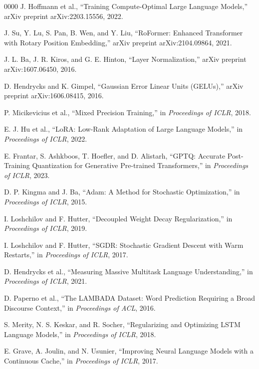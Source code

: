 \documentclass[conference]{IEEEtran}
\begin{document}
\begin{thebibliography}{00}{00}
J. Hoffmann et al., ``Training Compute-Optimal Large Language Models,'' arXiv preprint arXiv:2203.15556, 2022.

J. Su, Y. Lu, S. Pan, B. Wen, and Y. Liu, ``RoFormer: Enhanced Transformer with Rotary Position Embedding,'' arXiv preprint arXiv:2104.09864, 2021.

J. L. Ba, J. R. Kiros, and G. E. Hinton, ``Layer Normalization,'' arXiv preprint arXiv:1607.06450, 2016.

D. Hendrycks and K. Gimpel, ``Gaussian Error Linear Units (GELUs),'' arXiv preprint arXiv:1606.08415, 2016.

P. Micikevicius et al., ``Mixed Precision Training,'' in \textit{Proceedings of ICLR}, 2018.

E. J. Hu et al., ``LoRA: Low-Rank Adaptation of Large Language Models,'' in \textit{Proceedings of ICLR}, 2022.

E. Frantar, S. Ashkboos, T. Hoefler, and D. Alistarh, ``GPTQ: Accurate Post-Training Quantization for Generative Pre-trained Transformers,'' in \textit{Proceedings of ICLR}, 2023.


D. P. Kingma and J. Ba, ``Adam: A Method for Stochastic Optimization,'' in \textit{Proceedings of ICLR}, 2015.

I. Loshchilov and F. Hutter, ``Decoupled Weight Decay Regularization,'' in \textit{Proceedings of ICLR}, 2019.

I. Loshchilov and F. Hutter, ``SGDR: Stochastic Gradient Descent with Warm Restarts,'' in \textit{Proceedings of ICLR}, 2017.

D. Hendrycks et al., ``Measuring Massive Multitask Language Understanding,'' in \textit{Proceedings of ICLR}, 2021.

D. Paperno et al., ``The LAMBADA Dataset: Word Prediction Requiring a Broad Discourse Context,'' in \textit{Proceedings of ACL}, 2016.

S. Merity, N. S. Keskar, and R. Socher, ``Regularizing and Optimizing LSTM Language Models,'' in \textit{Proceedings of ICLR}, 2018.

E. Grave, A. Joulin, and N. Usunier, ``Improving Neural Language Models with a Continuous Cache,'' in \textit{Proceedings of ICLR}, 2017.


\end{thebibliography}
\end{document}
